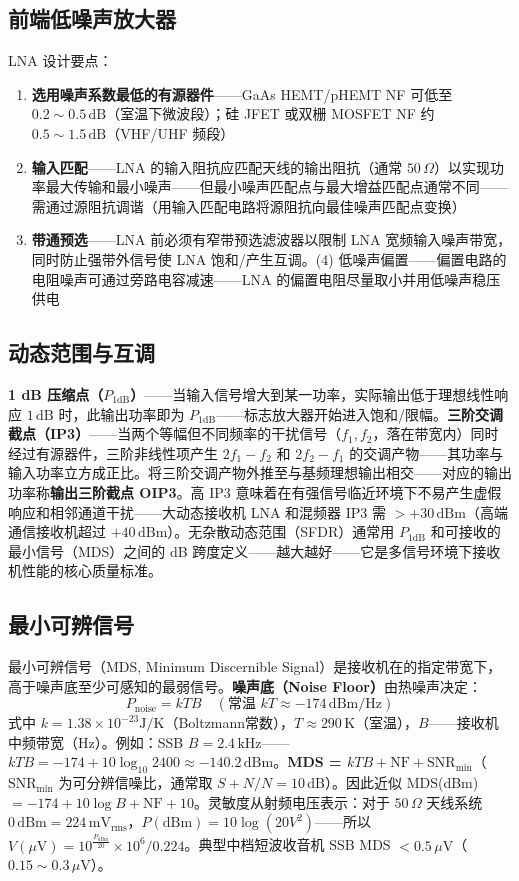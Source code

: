 \documentclass[12pt,UTF8]{ctexbook}
\begin{document}
\subsection{前端低噪声放大器}

LNA 设计要点：
\begin{enumerate}
\item \textbf{选用噪声系数最低的有源器件}——GaAs HEMT/pHEMT NF 可低至 $0.2\sim0.5\,\mathrm{dB}$（室温下微波段）；硅 JFET 或双栅 MOSFET NF 约 $0.5\sim1.5\,\mathrm{dB}$（VHF/UHF 频段）
\item \textbf{输入匹配}——LNA 的输入阻抗应匹配天线的输出阻抗（通常 $50\,\Omega$）以实现功率最大传输和最小噪声——但最小噪声匹配点与最大增益匹配点通常不同——需通过源阻抗调谐（用输入匹配电路将源阻抗向最佳噪声匹配点变换）
\item \textbf{带通预选}——LNA 前必须有窄带预选滤波器以限制 LNA 宽频输入噪声带宽，同时防止强带外信号使 LNA 饱和/产生互调。(4) 低噪声偏置——偏置电路的电阻噪声可通过旁路电容减速——LNA 的偏置电阻尽量取小并用低噪声稳压供电
\end{enumerate}

\subsection{动态范围与互调}

\textbf{1 dB 压缩点（$P_{1\mathrm{dB}}$）}——当输入信号增大到某一功率，实际输出低于理想线性响应 $1\,\mathrm{dB}$ 时，此输出功率即为 $P_{1\mathrm{dB}}$——标志放大器开始进入饱和/限幅。\textbf{三阶交调截点（IP3）}——当两个等幅但不同频率的干扰信号（$f_1,f_2$，落在带宽内）同时经过有源器件，三阶非线性项产生 $2f_1-f_2$ 和 $2f_2-f_1$ 的交调产物——其功率与输入功率立方成正比。将三阶交调产物外推至与基频理想输出相交——对应的输出功率称\textbf{输出三阶截点 OIP3}。高 IP3 意味着在有强信号临近环境下不易产生虚假响应和相邻通道干扰——大动态接收机 LNA 和混频器 IP3 需 $>+30\,\mathrm{dBm}$（高端通信接收机超过 $+40\,\mathrm{dBm}$）。无杂散动态范围（SFDR）通常用 $P_{1\mathrm{dB}}$ 和可接收的最小信号（MDS）之间的 dB 跨度定义——越大越好——它是多信号环境下接收机性能的核心质量标准。

\subsection{最小可辨信号}

最小可辨信号（MDS, Minimum Discernible Signal）是接收机在的指定带宽下，高于噪声底至少可感知的最弱信号。\textbf{噪声底（Noise Floor）}由热噪声决定：
\[
P_{\mathrm{noise}} = kTB \quad (\text{常温 } kT \approx -174\,\mathrm{dBm/Hz})
\]
式中 $k=1.38\times10^{-23}\mathrm{J/K}$（Boltzmann常数），$T\approx290\,\mathrm{K}$（室温），$B$——接收机中频带宽（Hz）。例如：SSB $B=2.4\,\mathrm{kHz}$——$kTB = -174 + 10\log_{10}2400 \approx -140.2\,\mathrm{dBm}$。\textbf{MDS = $kTB + \mathrm{NF} + \mathrm{SNR_{min}}$}（$\mathrm{SNR_{min}}$ 为可分辨信噪比，通常取 $S+N/N=10\,\mathrm{dB}$）。因此近似 MDS(dBm) $= -174 + 10\log B + \mathrm{NF} + 10$。灵敏度从射频电压表示：对于 $50\,\Omega$ 天线系统 $0\,\mathrm{dBm} = 224\,\mathrm{mV_{rms}}$，$P(\mathrm{dBm}) = 10\log(20V^2)$——所以 $V(\mu\mathrm{V}) = 10^{\frac{P_{\mathrm{dBm}}}{20}}\times 10^6/0.224$。典型中档短波收音机 SSB MDS $<0.5\,\mu\mathrm{V}$（$0.15\sim0.3\,\mu\mathrm{V}$）。
\end{document}
